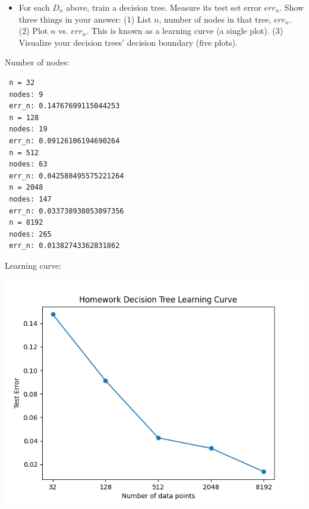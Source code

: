 \documentclass[a4paper]{article}
\theoremstyle{definition}
\newenvironment{soln}{
    \leavevmode\color{blue}\ignorespaces
}{}
\begin{document}
\begin{enumerate}
\begin{itemize}
  \item For each $D_n$ above, train a decision tree.  Measure its test set error $err_n$.  Show three things in your answer: (1) List $n$, number of nodes in that tree, $err_n$. (2) Plot $n$ vs. $err_n$.  This is known as a learning curve (a single plot). (3) Visualize your decision trees' decision boundary (five plots). \\
  \end{itemize}

        \begin{soln}
          Number of nodes:
\begin{verbatim}
 n = 32
 nodes: 9
 err_n: 0.14767699115044253
 n = 128
 nodes: 19
 err_n: 0.09126106194690264
 n = 512
 nodes: 63
 err_n: 0.042588495575221264
 n = 2048
 nodes: 147
 err_n: 0.033738938053097356
 n = 8192
 nodes: 265
 err_n: 0.01382743362831862
\end{verbatim}

          Learning curve:
          \begin{center}
            \includegraphics[width=0.6\linewidth]{DbigError.png}
          \end{center}


\end{soln}
\end{enumerate}
\end{document}

